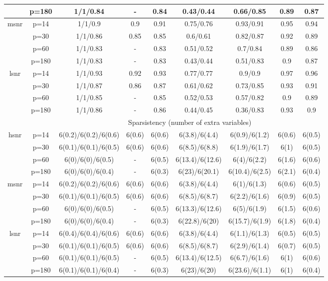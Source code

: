 \begin{table}[ht]
{\begin{tabular}{|c|c|ccccccc|}
   & p=180 & 1/1/0.84 & - & 0.84 & 0.43/0.44 & 0.66/0.85 & 0.89 & 0.87 \\ 
  \midrule\multirow{4}[2]{*}{msnr} & p=14 & 1/1/0.9 & 0.9 & 0.91 & 0.75/0.76 & 0.93/0.91 & 0.95 & 0.94 \\ 
   & p=30 & 1/1/0.86 & 0.85 & 0.85 & 0.6/0.61 & 0.82/0.87 & 0.92 & 0.89 \\ 
   & p=60 & 1/1/0.83 & - & 0.83 & 0.51/0.52 & 0.7/0.84 & 0.89 & 0.86 \\ 
   & p=180 & 1/1/0.83 & - & 0.83 & 0.43/0.44 & 0.51/0.83 & 0.9 & 0.87 \\ 
  \midrule\multirow{4}[2]{*}{lsnr} & p=14 & 1/1/0.93 & 0.92 & 0.93 & 0.77/0.77 & 0.9/0.9 & 0.97 & 0.96 \\ 
   & p=30 & 1/1/0.87 & 0.86 & 0.87 & 0.61/0.62 & 0.73/0.85 & 0.93 & 0.91 \\ 
   & p=60 & 1/1/0.85 & - & 0.85 & 0.52/0.53 & 0.57/0.82 & 0.9 & 0.89 \\ 
   & p=180 & 1/1/0.86 & - & 0.86 & 0.44/0.45 & 0.36/0.83 & 0.93 & 0.9 \\ 
   \midrule 
 \multicolumn{1}{|c}{} &       & \multicolumn{7}{c|}{Sparsistency (number of extra variables)} \\
\midrule\multirow{4}[2]{*}{hsnr} & p=14 & 6(0.2)/6(0.2)/6(0.6) & 6(0.6) & 6(0.6) & 6(3.8)/6(4.4) & 6(0.9)/6(1.2) & 6(0.6) & 6(0.5) \\ 
   & p=30 & 6(0.1)/6(0.1)/6(0.5) & 6(0.6) & 6(0.6) & 6(8.5)/6(8.8) & 6(1.9)/6(1.7) & 6(1) & 6(0.5) \\ 
   & p=60 & 6(0)/6(0)/6(0.5) & - & 6(0.5) & 6(13.4)/6(12.6) & 6(4)/6(2.2) & 6(1.6) & 6(0.6) \\ 
   & p=180 & 6(0)/6(0)/6(0.4) & - & 6(0.3) & 6(23)/6(20.1) & 6(10.4)/6(2.5) & 6(2.1) & 6(0.4) \\ 
  \midrule\multirow{4}[2]{*}{msnr} & p=14 & 6(0.2)/6(0.2)/6(0.6) & 6(0.6) & 6(0.6) & 6(3.8)/6(4.4) & 6(1)/6(1.3) & 6(0.6) & 6(0.5) \\ 
   & p=30 & 6(0.1)/6(0.1)/6(0.5) & 6(0.6) & 6(0.6) & 6(8.5)/6(8.7) & 6(2.2)/6(1.6) & 6(0.9) & 6(0.5) \\ 
   & p=60 & 6(0)/6(0)/6(0.5) & - & 6(0.5) & 6(13.3)/6(12.6) & 6(5)/6(1.9) & 6(1.5) & 6(0.6) \\ 
   & p=180 & 6(0)/6(0)/6(0.4) & - & 6(0.3) & 6(22.8)/6(20) & 6(15.7)/6(1.9) & 6(1.8) & 6(0.4) \\ 
  \midrule\multirow{4}[2]{*}{lsnr} & p=14 & 6(0.4)/6(0.4)/6(0.6) & 6(0.6) & 6(0.6) & 6(3.8)/6(4.4) & 6(1.1)/6(1.3) & 6(0.5) & 6(0.5) \\ 
   & p=30 & 6(0.1)/6(0.1)/6(0.5) & 6(0.6) & 6(0.6) & 6(8.5)/6(8.7) & 6(2.9)/6(1.4) & 6(0.7) & 6(0.5) \\ 
   & p=60 & 6(0.1)/6(0.1)/6(0.5) & - & 6(0.5) & 6(13.4)/6(12.5) & 6(6.7)/6(1.6) & 6(1) & 6(0.6) \\ 
   & p=180 & 6(0.1)/6(0.1)/6(0.4) & - & 6(0.3) & 6(23)/6(20) & 6(23.6)/6(1.1) & 6(1) & 6(0.4) \\ 
   \bottomrule 
\end{tabular}
}
\end{table}
